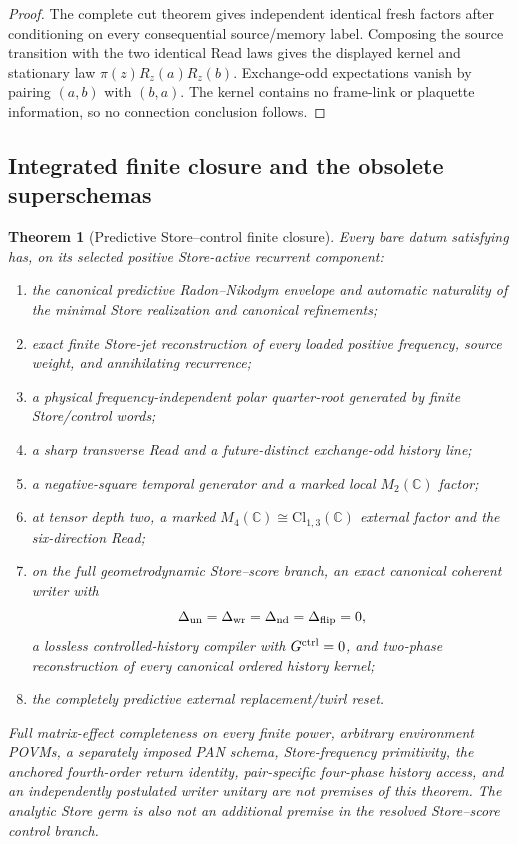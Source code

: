 \documentclass[11pt]{article}
\newtheorem{theorem}{Theorem}[section]
\theoremstyle{definition}
\theoremstyle{remark}
\newcommand{\C}{\mathbb C}
\newcommand{\Cl}{\mathrm{Cl}}
\begin{document}
\begin{proof}
The complete cut theorem gives independent identical fresh factors after
conditioning on every consequential source/memory label.  Composing the source
transition with the two identical Read laws gives the displayed kernel and
stationary law $\pi(z)R_z(a)R_z(b)$.  Exchange-odd expectations vanish by
pairing $(a,b)$ with $(b,a)$.  The kernel contains no frame-link or plaquette
information, so no connection conclusion follows.
\end{proof}

\subsection{Integrated finite closure and the obsolete superschemas}

\begin{theorem}[Predictive Store--control finite closure]
\label{thm:predictive-clock-discharge}
\label{thm:two-principle-discharge}
Every bare datum satisfying  has, on its
selected positive Store-active recurrent component:
\begin{enumerate}[label=\textup{(\roman*)},leftmargin=2.7em]
\item the canonical predictive Radon--Nikodym envelope and automatic
      naturality of the minimal Store realization and canonical refinements;
\item exact finite Store-jet reconstruction of every loaded positive frequency,
      source weight, and annihilating recurrence;
\item a physical frequency-independent polar quarter-root generated by finite
      Store/control words;
\item a sharp transverse Read and a future-distinct exchange-odd history line;
\item a negative-square temporal generator and a marked local $M_2(\C)$ factor;
\item at tensor depth two, a marked
      $M_4(\C)\cong\Cl_{1,3}(\C)$ external factor and the six-direction Read;
\item on the full geometrodynamic Store--score branch, an exact canonical
      coherent writer with
      \[
       \Delta_{\rm un}
       =\Delta_{\rm wr}
       =\Delta_{\rm nd}
       =\Delta_{\rm flip}=0,
      \]
      a lossless controlled-history compiler with $G^{\rm ctrl}=0$, and
      two-phase reconstruction of every canonical ordered history kernel;
\item the completely predictive external replacement/twirl reset.
\end{enumerate}
Full matrix-effect completeness on every finite power, arbitrary environment
POVMs, a separately imposed PAN schema, Store-frequency primitivity, the
anchored fourth-order return identity, pair-specific four-phase history
access, and an independently postulated writer unitary are not premises of
this theorem.  The analytic Store germ is also not an additional premise in
the resolved Store--score control branch.
\end{theorem}
\end{document}
